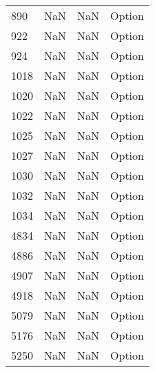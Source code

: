 \begin{tabular}{llll}
890  &                   NaN &                        NaN &                                    Option \\
922  &                   NaN &                        NaN &                                    Option \\
924  &                   NaN &                        NaN &                                    Option \\
1018 &                   NaN &                        NaN &                                    Option \\
1020 &                   NaN &                        NaN &                                    Option \\
1022 &                   NaN &                        NaN &                                    Option \\
1025 &                   NaN &                        NaN &                                    Option \\
1027 &                   NaN &                        NaN &                                    Option \\
1030 &                   NaN &                        NaN &                                    Option \\
1032 &                   NaN &                        NaN &                                    Option \\
1034 &                   NaN &                        NaN &                                    Option \\
4834 &                   NaN &                        NaN &                                    Option \\
4886 &                   NaN &                        NaN &                                    Option \\
4907 &                   NaN &                        NaN &                                    Option \\
4918 &                   NaN &                        NaN &                                    Option \\
5079 &                   NaN &                        NaN &                                    Option \\
5176 &                   NaN &                        NaN &                                    Option \\
5250 &                   NaN &                        NaN &                                    Option \\

\end{tabular}
